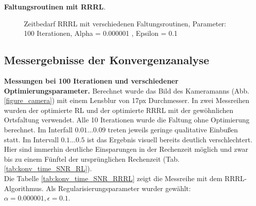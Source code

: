 \documentclass[a4paper,12pt]{article}
\begin{document}
\textbf{Faltungsroutinen mit RRRL}.

\begin{figure}[htbp]
\caption{Zeitbedarf RRRL mit verschiedenen Faltungsroutinen, Parameter: 100
Iterationen, Alpha = 0.000001 , Epsilon = 0.1 }%
\label{figure_zeit_rrrl}
\end{figure}







 
\subsection{Messergebnisse der Konvergenzanalyse}

\textbf{Messungen bei 100 Iterationen und verschiedener Optimierungsparameter.}
Berechnet wurde das Bild des Kameramanns (Abb. \ref{figure_camera}) mit einem Lensblur von 17px Durchmesser. In zwei Messreihen wurden der optimierte
RL und der optimierte RRRL mit der gewöhnlichen Ortsfaltung verwendet. 
Alle 10 Iterationen wurde die Faltung ohne Optimierung berechnet.
Im Interfall $0.01\ldots0.09$ treten jeweils geringe qualitative Einbußen statt.
Im Intervall $0.1\ldots0.5$ ist das Ergebnis visuell bereits deutlich
verschlechtert. Hier sind immerhin deutliche Einsparungen in der Rechenzeit
möglich und zwar bis zu einem Fünftel der ursprünglichen Rechenzeit
(Tab. \ref{tab:konv_time_SNR_RL}).
\\
Die Tabelle \ref{tab:konv_time_SNR_RRRL} zeigt die Messreihe mit dem
RRRL-Algorithmus. Als Regularisierungsparameter wurder gewählt: 
$\alpha = 0.000001, \epsilon = 0.1$.
\end{document}
